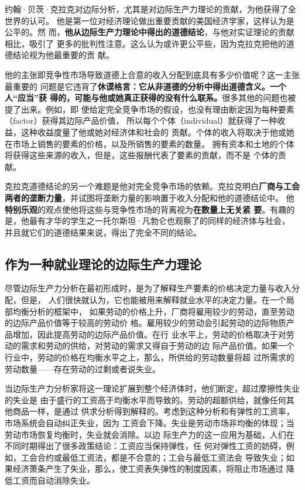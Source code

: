 约翰·贝茨·克拉克对边际分析，尤其是对边际生产力理论的贡献，为他获得了全世界的认可。
他是第一位对经济理论做出重要贡献的美国经济学家，这样认为是公平的。然
而，\textbf{他从边际生产力理论中得出的道德结论}，与他对实证理论的贡献相比，吸引了
更多的批判性注意。这么认为或许更公平些，因为克拉克把他的道德结论视为他最重要的贡
献。

他的主张即竞争性市场导致道德上合意的收入分配到底具有多少价值呢？这一主张最重要的
问题是它违背了\textbf{休谟格言：它从非道德的分析中得出道德含义。一个人“应当”获
  得的，可能与他或她真正获得的没有什么联系。}很多其他的问题也被提了出来。例如，即
使给定完全竞争市场的假设，也没有理由断定因为每种要素（factor）获得其边际产品价值，
所以每个个体（individual）就获得了一种收益，这种收益度量了他或她对经济体和社会的
贡献。个体的收入将取决于他或她在市场上销售的要素的价格，以及所销售的要素的数量。
拥有资本和土地的个体将获得这些来源的收入，但是，这些报酬代表了要素的贡献，而不是
个体的贡献。

克拉克道德结论的另一个难题是他对完全竞争市场的依赖。克拉克明白\textbf{厂商与工会
  两者的垄断力量}，并试图将垄断力量的影响置于收入分配和他的道德结论中。
他\textbf{特别乐观}的观点使他将这些与竞争性市场的背离视为\textbf{在数量上无关紧
  要}。有趣的是，他最有才华的学生之一托尔斯坦·凡勃仑也观察了的同样的经济体与社会，
并且就它们的道德结果来说，得出了完全不同的结论。

\subsection{作为一种就业理论的边际生产力理论}

尽管边际生产力分析在最初形成时，是为了解释生产要素的价格决定力量与收入分配，但是，
人们很快就认为，它也能被用来解释就业水平的决定力量。在一个局部均衡分析的框架中，
如果劳动的价格上升，厂商将雇用较少的劳动，直至劳动的边际产品价值等于较高的劳动价
格。雇用较少的劳动会引起劳动的边际物质产品增加，因此提高劳动的边际产品价值。在行
业水平上，劳动的价格取决于对劳动的需求和劳动的供给，对劳动的需求又得自于劳动的边
际产品价值。如果一个行业中，劳动的价格在均衡水平之上，那么，所供给的劳动数量将超
过所需求的劳动数量——存在劳动的过剩或者说失业。

当边际生产力分析家将这一理论扩展到整个经济体时，他们断定，超过摩擦性失业的失业是
由于盛行的工资高于均衡水平而导致的。劳动的超额供给，就像任何其他商品一样，是通过
供求分析得到解释的。考虑到这种分析和有弹性的工资率，市场系统会自动纠正失业，因为
工资会下降。失业是劳动市场非均衡的体现；当劳动市场恢复均衡时，失业就会消除。以边
际生产力的这一应用为基础，人们在不同时期得出了很多政策结论：工资应当保持弹性，任
何对弹性工资的妨碍，例如，工会合约或最低工资法，都是不合意的；工会与最低工资法会
导致失业；如果经济萧条产生了失业，那么，使工资表失弹性的制度因素，将阻止市场通过
降低工资而自动消除失业。

